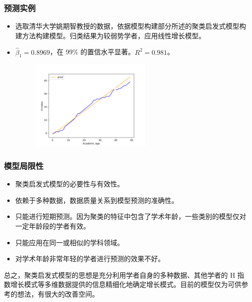 \documentclass[11pt,compress,t, xcolor=table]{beamer}
\begin{document}
\begin{frame}
	\frametitle{预测实例}
	
\begin{itemize}
	\item 选取清华大学姚期智教授的数据，依据模型构建部分所述的聚类启发式模型构建方法构建模型。归类结果为较弱势学者，应用\textcolor{TsinghuaPurple}{线性增长模型}。
	\item $\hat{\beta}_1 = 0.8969$，在 99\% 的置信水平显著。$R^2 = 0.981$。
	\begin{figure}[H]
		\small
		\centering
		\includegraphics[width=6cm]{image/yao.png}
	\end{figure}
\end{itemize}

\end{frame}

\begin{frame}
	\frametitle{模型局限性}
	
\begin{itemize}
	\item 聚类启发式模型的\textcolor{TsinghuaPurple}{必要性与有效性}。
	\item 依赖于多种数据，\textcolor{TsinghuaPurple}{数据质量}关系到模型预测的准确性。
	\item 只能进行\textcolor{TsinghuaPurple}{短期预测}。因为聚类的特征中包含了学术年龄，一些类别的模型仅对一定年龄段的学者有效。
	\item 只能应用在同一或相似的\textcolor{TsinghuaPurple}{学科领域}。
	\item 对学术年龄\textcolor{TsinghuaPurple}{非常年轻}的学者进行预测的效果不好。
	
\end{itemize}
\smallskip

总之，聚类启发式模型的思想是充分利用学者自身的多种数据、其他学者的 H 指数增长模式等\textcolor{TsinghuaPurple}{多维数据提供的信息}精细化地确定增长模式。目前的模型仅为可供参考的想法，有很大的改善空间。


\end{frame}
\end{document}
